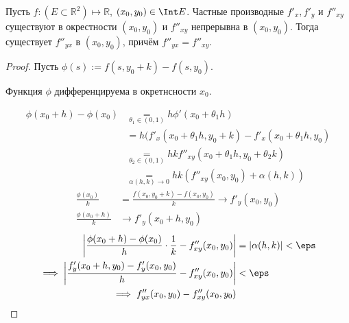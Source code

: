 \begin{theorem} \thmslashn

    Пусть $f : (E \subset \mathbb{R}^2) \mapsto \mathbb{R}$, $(x_0, y_0)\in \Int E$. Частные производные $f'_{x}, f'_{y}$ и $f''_{xy}$ существуют в окрестности $(x_0, y_0)$ и $f''_{xy}$ непрерывна в $(x_0, y_0)$. Тогда существует $f''_{yx}$ в $(x_0, y_0)$, причём $f''_{yx}=f''_{xy}$.
    \begin{proof} \thmslashn
    
        Пусть $\phi(s) := f(s, y_0+k)-f(s, y_0)$.

        Функция $\phi$ дифференцируема в окретнсности $x_0$.

    \begin{equation*}
        \begin{split}
            \phi(x_0+h)-\phi(x_0)
            &\underset{\theta_1\in (0, 1)}{=} h\phi'(x_0+\theta_1h)\\
            &= h(f'_{x}(x_0+\theta_1h, y_0+k)-f'_{x}(x_0+\theta_1h, y_0)\\
            &\underset{\theta_2\in (0, 1)}{=} hkf''_{xy}(x_0+\theta_1h, y_0+\theta_2k)\\
            &\underset{\alpha(h, k) \to  0}= hk(f''_{xy}(x_0, y_0) + \alpha(h, k))
        \end{split}
    \end{equation*}
    \begin{equation*}
        \begin{split}
            \frac{\phi(x_0)}{k} 
            &= \frac{f(x_0, y_0+k)-f(x_0, y_0)}{k} \to f'_{y}(x_0, y_0)\\
            \frac{\phi(x_0+h)}{k} 
            &\to f'_{y}(x_0+h, y_0)
        \end{split}
    \end{equation*}
    \begin{equation*}
        \begin{split}
            \left|\frac{\phi(x_0+h)-\phi(x_0)}{h} \cdot \frac{1}{k} - f''_{xy}(x_0, y_0)\right| 
            &= |\alpha(h, k)| < \eps\\
            \implies \left|\frac{f'_{y}(x_0+h,y_0) - f'_{y}(x_0,y_0)}{h} - f''_{xy}(x_0, y_0)\right| 
            &< \eps\\
            \implies f''_{yx}(x_0, y_0) - f''_{xy}(x_0, y_0)
        \end{split}
    \end{equation*}
    \end{proof}
\end{theorem}
